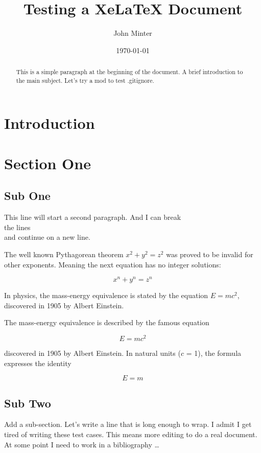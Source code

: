 \documentclass[12pt]{article} %
\title{Testing a XeLaTeX Document}
\author{John Minter}
\date{\today} %
\begin{document}
\maketitle

\begin{abstract}
This is a simple paragraph at the beginning of the document. A brief introduction to the main subject.
Let's try a mod to test .gitignore.
\end{abstract}

\section{Introduction}

\section{Section One}

\subsection{Sub One}

This line will start a second paragraph. And I can
 break\\ the lines \\ and continue on a new line.
 
The well known Pythagorean theorem \(x^2 + y^2 = z^2\) was 
proved to be invalid for other exponents. 
Meaning the next equation has no integer solutions:

\[ x^n + y^n = z^n \]

In physics, the mass-energy equivalence is stated 
by the equation $E=mc^2$, discovered in 1905 by Albert Einstein.

The mass-energy equivalence is described by the famous equation

\[E=mc^2\]

discovered in 1905 by Albert Einstein. 
In natural units ($c$ = 1), the formula expresses the identity

\begin{equation}
E=m
\end{equation}

\subsection{Sub Two}

Add a sub-section. Let's write a line that is long enough to wrap. I admit I get tired of writing 
these test cases. This means more editing to do a real document.  At some point I need to work
in a bibliography \ldots
\end{document}
